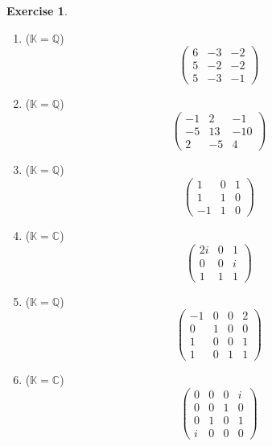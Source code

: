 \documentclass{article}
\theoremstyle{plain}
\theoremstyle{definition}
\newtheorem{xca}[exmp]{Exercise}
\theoremstyle{remark}
\begin{document}
\begin{bxthm}
\begin{xca}
\begin{multicols}{2}
\begin{enumerate}
    \item ($\mathbb{K}=\mathbb{Q}$)
    \[
      \begin{pmatrix}
      6 & -3 & -2 \\
      5 & -2 & -2 \\
      5 & -3 & -1
      \end{pmatrix}
    \]
    \item ($\mathbb{K}=\mathbb{Q}$)
    \[
      \begin{pmatrix}
      -1 & 2 & -1 \\
      -5 & 13 & -10 \\
      2 & -5 & 4
      \end{pmatrix}
    \]
    \item ($\mathbb{K}=\mathbb{Q}$)
    \[
      \begin{pmatrix}
      1 & 0 & 1 \\
      1 & 1 & 0 \\
      -1 & 1 & 0
      \end{pmatrix}
    \]
    \item ($\mathbb{K}=\mathbb{C}$)
    \[
      \begin{pmatrix}
      2i & 0 & 1 \\
      0 & 0 & i \\
      1 & 1 & 1
      \end{pmatrix}
    \]
    \item ($\mathbb{K}=\mathbb{Q}$)
    \[
      \begin{pmatrix}
      -1 & 0 & 0& 2 \\
      0 & 1 & 0 & 0\\
      1 & 0 & 0 & 1\\
      1&0&1&1
      \end{pmatrix}
    \]
    \item ($\mathbb{K}=\mathbb{C}$)
    \[
      \begin{pmatrix}
      0 & 0 & 0& i \\
      0 & 0 & 1 & 0\\
      0 & 1 & 0 & 1\\
      i&0&0&0
      \end{pmatrix}
    \]
    \end{enumerate}
    \end{multicols}
\end{xca}
\end{bxthm}
\end{document}
